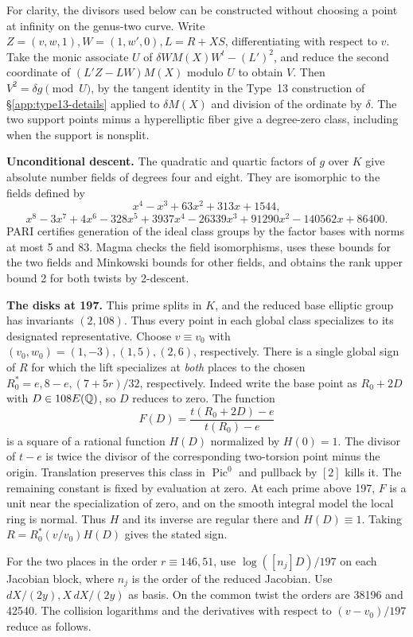 For clarity, the divisors used below can be constructed without
choosing a point at infinity on the genus-two curve. Write
\(Z=(v,w,1), W=(1,w',0), L=R+XS\), differentiating with respect
to \(v\). Take the monic associate \(U\) of
\(\delta W M(X) W^t-(L')^2\), and reduce the second coordinate of
\((L'Z-LW)M(X)\) modulo \(U\) to obtain \(V\).
Then \(V^2=\delta g\pmod U\), by the tangent identity in the Type~13 construction of \S\ref{app:type13-details}
applied to \(\delta M(X)\) and division of the ordinate by \(\delta\).
The two support points minus a hyperelliptic fiber give a degree-zero
class, including when the support is nonsplit.

\textbf{Unconditional descent.} The quadratic and quartic factors of \(g\)
over \(K\) give absolute number fields of degrees four and eight.
They are isomorphic to the fields defined by
\[x^4-x^3+63x^2+313x+1544,\]\[
 x^8-3x^7+4x^6-328x^5+3937x^4-26339x^3+91290x^2-140562x+86400.\]
PARI certifies generation of the ideal class groups by the factor
bases with norms at most 5 and 83. Magma checks the field
isomorphisms, uses these bounds for the two fields and Minkowski
bounds for other fields, and obtains the rank upper bound 2 for
both twists by 2-descent.

\textbf{The disks at 197.} This prime splits in \(K\), and the reduced base
elliptic group has invariants \((2,108)\). Thus every point in each
global class specializes to its designated representative. Choose
\(v\equiv v_0\) with \((v_0,w_0)=(1,-3),(1,5),(2,6)\), respectively.
There is a single global sign of \(R\) for which the lift specializes
at \emph{both} places to the chosen
\(R_0^*=e,8-e,(7+5r)/32\), respectively. Indeed write the base point as
\(R_0+2D\) with \(D\in108E(\mathbb Q)\), so \(D\) reduces to zero.
The function
\[F(D)=\frac{t(R_0+2D)-e}{t(R_0)-e}\]
is a square of a rational function \(H(D)\) normalized by \(H(0)=1\).
The divisor of \(t-e\) is twice the divisor of the corresponding
two-torsion point minus the origin. Translation preserves this class
in \(\operatorname{Pic}^0\) and pullback by \([2]\) kills it. The
remaining constant is fixed by evaluation at zero. At each prime
above 197, \(F\) is a unit near the specialization of zero, and on
the smooth integral model the local ring is normal. Thus \(H\) and
its inverse are regular there and \(H(D)\equiv1\). Taking
\(R=R_0^*(v/v_0)H(D)\) gives the stated sign.

For the two places in the order \(r\equiv146,51\), use
\(\log([n_j]D)/197\) on each Jacobian block, where \(n_j\) is the
order of the reduced Jacobian. Use \(dX/(2y),X\,dX/(2y)\) as basis.
On the common twist the orders are 38196 and 42540. The collision
logarithms and the derivatives with respect to \((v-v_0)/197\)
reduce as follows.

